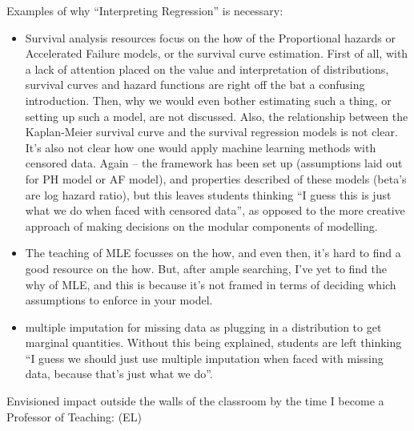 \documentclass[]{book}
\providecommand{\tightlist}{%
  \setlength{\itemsep}{0pt}\setlength{\parskip}{0pt}}
\begin{document}
Examples of why ``Interpreting Regression'' is necessary:

\begin{itemize}
\tightlist
\item
  Survival analysis resources focus on the how of the Proportional hazards or Accelerated Failure models, or the survival curve estimation. First of all, with a lack of attention placed on the value and interpretation of distributions, survival curves and hazard functions are right off the bat a confusing introduction. Then, why we would even bother estimating such a thing, or setting up such a model, are not discussed. Also, the relationship between the Kaplan-Meier survival curve and the survival regression models is not clear. It's also not clear how one would apply machine learning methods with censored data. Again -- the framework has been set up (assumptions laid out for PH model or AF model), and properties described of these models (beta's are log hazard ratio), but this leaves students thinking ``I guess this is just what we do when faced with censored data'', as opposed to the more creative approach of making decisions on the modular components of modelling.
\item
  The teaching of MLE focusses on the how, and even then, it's hard to find a good resource on the how. But, after ample searching, I've yet to find the why of MLE, and this is because it's not framed in terms of deciding which assumptions to enforce in your model.
\item
  multiple imputation for missing data as plugging in a distribution to get marginal quantities. Without this being explained, students are left thinking ``I guess we should just use multiple imputation when faced with missing data, because that's just what we do''.
\end{itemize}

Envisioned impact outside the walls of the classroom by the time I become a Professor of Teaching: (EL)
\end{document}
